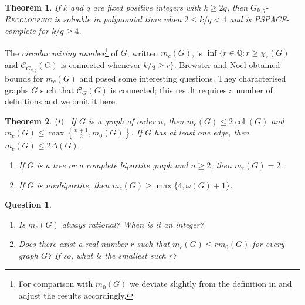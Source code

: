 \documentclass[12pt]{article}%
\newtheorem{theorem}{Theorem}[section]
\newtheorem{question}{Question}[section]
\begin{document}
\begin{theorem}
\emph{\cite{26CM-BMMN}}\hspace{0.1in}If $k$ and $q$ are fixed positive
integers with $k\geq2q$, then $G_{k,q}$\textsc{-Recolouring} is solvable in
polynomial time when $2\leq k/q<4$ and is PSPACE-complete for $k/q\geq4$.
\end{theorem}

The \emph{circular mixing number}\footnote{For comparison with $m_{0}(G)$ we
deviate slightly from the definition in \cite{26CM-BN} and adjust the results
accordingly.} of $G$, written $m_{c}(G)$, is $\inf\{r\in\mathbb{Q}:r\geq
\chi_{c}(G)$ and $\mathcal{C}_{G_{k,q}}(G)$ is connected whenever $k/q\geq
r\}$. Brewster and Noel \cite{26CM-BN} obtained bounds for $m_{c}(G)$ and
posed some interesting questions. They characterised graphs $G$ such that
$\mathcal{C}_{G}(G)$ is connected; this result requires a number of
definitions and we omit it here.

\begin{theorem}
\emph{\cite{26CM-BN}}\hspace{0.1in}$(i)\hspace{0.1in}$If $G$ is a graph of
order $n$, then $m_{c}(G)\leq2\operatorname{col}(G)$ and $m_{c}(G)\leq
\max\left\{  \frac{n+1}{2},m_{0}(G)\right\}  $. If $G$ has at least one edge,
then $m_{c}(G)\leq2\Delta(G)$.

\begin{enumerate}
\item[$(ii)$] If $G$ is a tree or a complete bipartite graph and $n\geq2$,
then $m_{c}(G)=2$.

\item[$(iii)$] If $G$ is nonbipartite, then $m_{c}(G)\geq\max\{4,\omega
(G)+1\}$.
\end{enumerate}
\end{theorem}

\begin{question}
\emph{\cite{26CM-BN}} 

\begin{enumerate}
\item[$(i)$] Is $m_{c}(G)$ always rational? When is it an integer?

\item[$(ii)$] Does there exist a real number $r$ such that $m_{c}(G)\leq
rm_{0}(G)$ for every graph $G$? If so, what is the smallest such $r$?
\end{enumerate}
\end{question}
\end{document}
